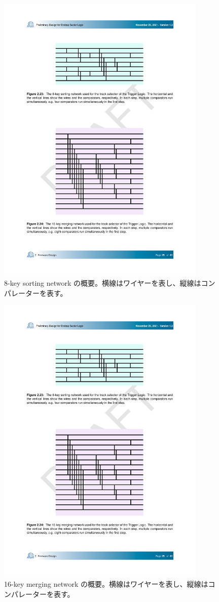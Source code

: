 \begin{figure} 
\centering
\includegraphics[width=10cm]{fig/SL/Sortiing_8key.pdf}
\caption[8-key sorting network の概要]{8-key sorting network の概要。横線はワイヤーを表し、縦線はコンパレーターを表す。}
\label{Sortiing_8key}
\end{figure}

\begin{figure} 
\centering
\includegraphics[width=10cm]{fig/SL/Sorting_16.pdf}
\caption[16-key merging network の概要]{16-key merging network の概要。横線はワイヤーを表し、縦線はコンパレーターを表す。}
\label{Sorting_16}
\end{figure}

